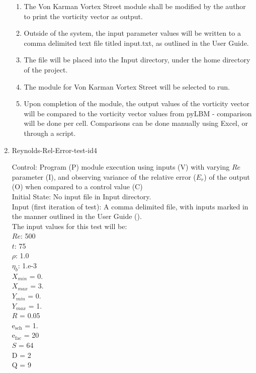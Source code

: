 \documentclass[12pt, titlepage]{article}
\begin{document}
\begin{enumerate}
\begin{enumerate}
\item The Von Karman Vortex Street module shall be modified by the author to print the vorticity vector as output.
\item Outside of the system, the input parameter values will be written to a comma delimited text file titled input.txt, as outlined in the User Guide.
\item The file will be placed into the Input directory, under the home directory of the project.
\item The module for Von Karman Vortex Street will be selected to run.
\item Upon completion of the module, the output values of the vorticity vector will be compared to the vorticity vector values from pyLBM - comparison will be done per cell. Comparisons can be done manually using Excel, or through a script.\\
\end{enumerate}

\item{Reynolds-Rel-Error-test-id4\\}

Control: Program (P) module execution using  inputs (V) with varying $Re$ parameter (I), and observing variance of the relative error ($E_r$) of the output (O) when compared to a control value (C) \\
					
Initial State: No input file in Input directory.\\
					
Input (first iteration of test): A comma delimited file, with inputs marked in the manner outlined in the User Guide (\citet{LBM_UserGuide_PM}).\\The input values for this test will be:\\
$Re$: 500\\
$t$: 75\\
$\rho$: 1.0\\
$\eta_b$: 1.e-3\\
$X_{min}$ = 0.\\
$X_{max}$ = 3.\\
$Y_{min}$ = 0.\\
$Y_{max}$ = 1.\\
$R$ = 0.05\\
$\mathrm{e_{sch}}$ = 1.\\
$\mathrm{e_{fac}}$ = 20\\
$S$ = 64\\
$\mathrm{D}$ = 2\\
$\mathrm{Q}$ = 9\\


\end{enumerate}
\end{document}
